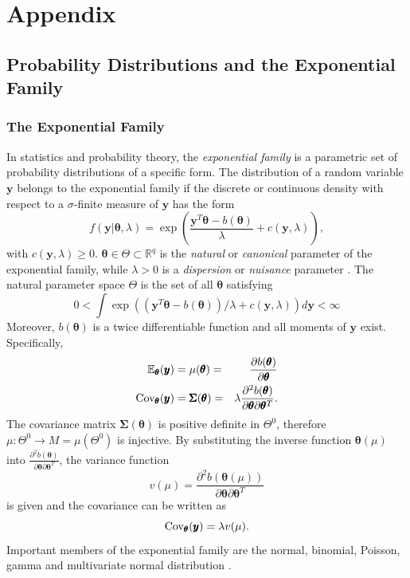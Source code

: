%
\chapter{Appendix}
\label{sec:appendix}
\section{Probability Distributions and the Exponential Family}
\subsection{The Exponential Family}
In statistics and probability theory, the \textit{exponential family} is a parametric set of probability distributions of a specific form. The distribution of a random variable $\pmb{y}$ belongs to the exponential family if the discrete or continuous density with respect to a $\sigma$-finite measure of $\pmb{y}$ has the form
\begin{equation}
    f(\pmb{y}|\pmb{\theta}, \lambda)=\exp\left(\frac{\pmb{y}^T\pmb{\theta} - b(\pmb{\theta})}{\lambda}+c(\pmb{y},\lambda) \right),
\end{equation}
with $c(\pmb{y},\lambda)\geq 0$. 
$\pmb{\theta}\in\Theta\subset\mathbb{R}^q$ is the \textit{natural} or \textit{canonical} parameter of the exponential family, while $\lambda > 0$ is a \textit{dispersion} or \textit{nuisance} parameter \autocite[][]{holland1981exponential}. The natural parameter space $\Theta$ is the set of all $\pmb{\theta}$ satisfying
\begin{equation}
    0<\int\exp\left(\left(\pmb{y}^T\pmb{\theta} - b(\pmb{\theta})\right)/\lambda+c(\pmb{y},\lambda) \right)d\pmb{y}< \infty
\end{equation} Moreover, $b(\pmb{\theta})$ is a twice differentiable  function and all moments of $\pmb{y}$ exist. Specifically, 
\begin{alignat}{3}
    \mathbb{E}_{\pmb{\theta}}(\pmb{y}) &= \mu(\pmb{\theta}) =& \frac{\partial b(\pmb{\theta})}{\partial\pmb{\theta}} \\
    \hbox{Cov}_{\pmb{\theta}}(\pmb{y}) &= \pmb{\Sigma}(\pmb{\theta}) =& \lambda\frac{\partial^2b(\pmb{\theta})}{\partial\pmb{\theta}\partial\pmb{\theta}^T}.
\end{alignat}
The covariance matrix $\pmb{\Sigma}(\pmb{\theta})$ is positive definite in $\Theta^0$, therefore $\mu:\Theta^0\rightarrow  M = \mu\left(\Theta^0\right)$ is injective. By substituting the inverse function $\pmb{\theta}(\mu)$ into $\frac{\partial^2b(\pmb{\theta})}{\partial\pmb{\theta}\partial\pmb{\theta}^T}$, the variance function 
\begin{equation}
    v(\mu)=\frac{\partial^2b(\pmb{\theta}(\mu))}{\partial\pmb{\theta}\partial\pmb{\theta}^T}
\end{equation}
is given and the covariance can be written as
\begin{equation}
    \hbox{Cov}_{\pmb{\theta}}(\pmb{y}) = \lambda v(\mu).
\end{equation}
Important members of the exponential family are the normal, binomial, Poisson, gamma and multivariate normal distribution \autocite[][433]{fahrmeir2013multivariate}.

